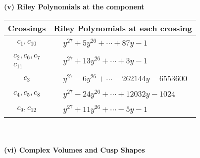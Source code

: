 \documentclass[1p]{elsarticle_modified}
\theoremstyle{definition}
\begin{document}
\flushleft \textbf{(v) Riley Polynomials at the component}\newline \\
\begin{tabular}{m{50pt}|m{274pt}}
Crossings & \hspace{64pt}Riley Polynomials at each crossing \\
\hline $$\begin{aligned}c_{1},c_{10}\end{aligned}$$&$\begin{aligned}
&y^{27}+5 y^{26}+\cdots+87 y-1
\end{aligned}$\\
\hline $$\begin{aligned}c_{2},c_{6},c_{7}\\c_{11}\end{aligned}$$&$\begin{aligned}
&y^{27}+13 y^{26}+\cdots+3 y-1
\end{aligned}$\\
\hline $$\begin{aligned}c_{3}\end{aligned}$$&$\begin{aligned}
&y^{27}-6 y^{26}+\cdots-262144 y-6553600
\end{aligned}$\\
\hline $$\begin{aligned}c_{4},c_{5},c_{8}\end{aligned}$$&$\begin{aligned}
&y^{27}-24 y^{26}+\cdots+12032 y-1024
\end{aligned}$\\
\hline $$\begin{aligned}c_{9},c_{12}\end{aligned}$$&$\begin{aligned}
&y^{27}+11 y^{26}+\cdots-5 y-1
\end{aligned}$\\
\hline
\end{tabular}\\~\\
\newpage\flushleft \textbf{(vi) Complex Volumes and Cusp Shapes}
\end{document}
